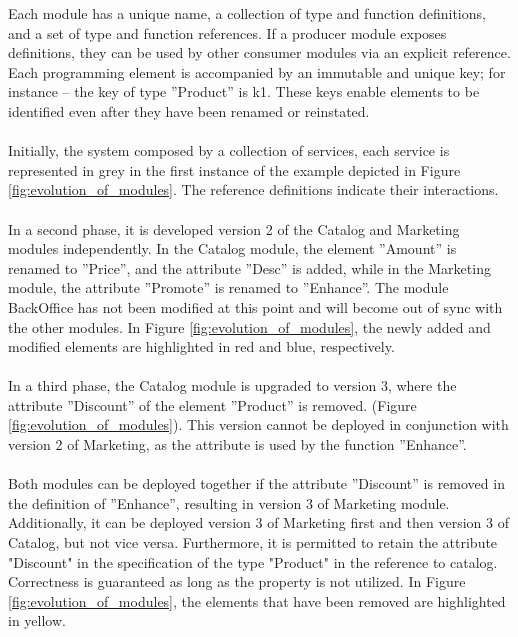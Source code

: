 Each module has a unique name, a collection of type and function definitions, and a set of type and function references.
If a producer module exposes definitions, they can be used by other consumer modules via an explicit reference.
Each programming element is accompanied by an immutable and unique key; for instance – the key of type ''Product'' is k1.
These keys enable elements to be identified even after they have been renamed or reinstated.

\paragraph{}

Initially, the system composed by a collection of services,
each service is represented in grey in the first instance of the example depicted in Figure \ref{fig:evolution_of_modules}.
The reference definitions indicate their interactions.

\paragraph{}

In a second phase, it is developed version 2 of the Catalog and Marketing modules independently.
In the Catalog module, the element ''Amount'' is renamed to ''Price'', and the attribute ''Desc'' is added, while in the Marketing module,
the attribute ''Promote'' is renamed to ''Enhance''.
The module BackOffice has not been modified at this point and will become out of sync with the other modules.
In Figure \ref{fig:evolution_of_modules}, the newly added and modified elements are highlighted in red and blue, respectively.

\paragraph{}

In a third phase, the Catalog module is upgraded to version 3, where the attribute ''Discount'' of the element ''Product'' is removed.  (Figure \ref{fig:evolution_of_modules}).
This version cannot be deployed in conjunction with version 2 of Marketing, as the attribute is used by the function ''Enhance''.

\paragraph{}

Both modules can be deployed together if the attribute ''Discount'' is removed in the definition of ''Enhance'', resulting in version 3 of Marketing module.
Additionally, it can be deployed version 3 of Marketing first and then version 3 of Catalog, but not vice versa.
Furthermore, it is permitted to retain the attribute "Discount" in the specification of the type "Product" in the reference to catalog.
Correctness is guaranteed as long as the property is not utilized.
In Figure \ref{fig:evolution_of_modules}, the elements that have been removed are highlighted in yellow.

